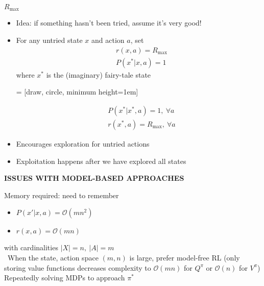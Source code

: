 \begin{whitebox}{\textbf{$R_{\max}$}}
    \begin{itemize}
        \item Idea: if something hasn't been tried, assume it's very good!
        \item For any untried state $x$ and action $a$, set
        \begin{align*}
            &r(x,a)=R_{\max}\\
            &P(x^*|x,a)=1
        \end{align*}
        where $x^*$ is the (imaginary) fairy-tale state
        \begin{minipage}[l]{0.2\linewidth}
             = [draw, circle, minimum height=1em]
        \end{minipage}%
        \begin{minipage}[c]{0.3\linewidth}
            \begin{align*}
                &P(x^*|x^*,a)=1,\ \forall a\\
                &r(x^*,a)=R_{\max},\ \forall a
            \end{align*}
        \end{minipage}

        \item Encourages exploration for untried actions
        \item Exploitation happens after we have explored all states
    \end{itemize}
\end{whitebox}

\begin{whitebox}{\textbf{ISSUES WITH MODEL-BASED APPROACHES}}
    \begin{itemize}
        \itemCon Memory required: need to remember
        \begin{itemize}
            \item $P(x'|x,a)=\mathcal{O}(mn^2)$
            \item $r(x,a)=\mathcal{O}(mn)$
        \end{itemize}
        with cardinalities $|X|=n,\ |A|=m$\\
        \faWarning\ When the state, action space $(m,n)$ is large, prefer model-free RL (only storing value functions decreases complexity to $\mathcal{O}(mn)$ for $Q^\pi$ or $\mathcal{O}(n)$ for $V^\pi$)
        \itemCon Repeatedly solving MDPs to approach $\pi^*$
    \end{itemize}
\end{whitebox}

